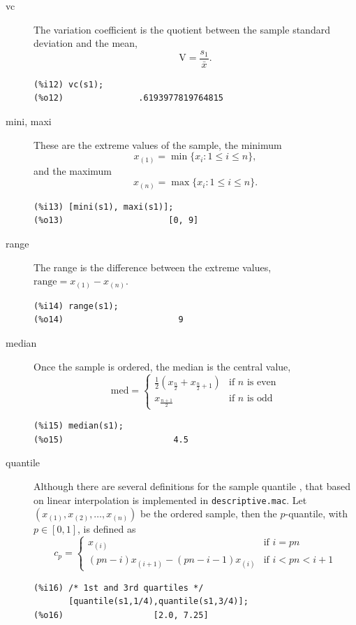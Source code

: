 \documentclass[12pt,a4paper]{article}
\begin{document}
\begin{description}
\item[vc] The variation coefficient is the quotient between the sample standard deviation and the mean,
\[
\mbox{V}= \frac{s_1}{\bar{x}}.
\]
\begin{verbatim}
(%i12) vc(s1);
(%o12)               .6193977819764815
\end{verbatim}

\item[mini, maxi] These are the extreme values of the sample, the minimum
\[
x_{(1)}=\min\{x_i: 1 \leq i \leq n\},
\]
and the maximum
\[
x_{(n)}=\max\{x_i: 1 \leq i \leq n\}.
\]
\begin{verbatim}
(%i13) [mini(s1), maxi(s1)];
(%o13)                     [0, 9]
\end{verbatim}

\item[range] The range is the difference between the extreme values, $\mbox{range}=x_{(1)}-x_{(n)}$.
\begin{verbatim}
(%i14) range(s1);
(%o14)                       9
\end{verbatim}

\item[median] Once the sample is ordered, the median is the central value,
\[
\mbox{med}= \left\{ \begin{array}{ll}
               \frac{1}{2} (x_{\frac{n}{2}} + x_{\frac{n}{2} + 1}) & \mbox{if $n$ is even} \\
               x_{\frac{n+1}{2}}                               & \mbox{if $n$ is odd}
            \end{array} \right.
\]
\begin{verbatim}
(%i15) median(s1);
(%o15)                      4.5
\end{verbatim}

\item[quantile] Although there are several definitions for the sample quantile \cite{hynd}, that based on linear interpolation is implemented in \verb|descriptive.mac|. Let $(x_{(1)}, x_{(2)}, \ldots, x_{(n)})$ be the ordered sample, then the $p$-quantile, with $p \in [0,1]$, is defined as
\[
c_p= \left\{ \begin{array}{ll}
               x_{(i)} & \mbox{if $i=p n$} \\
               (p n-i)x_{(i+1)}-(p n-i-1)x_{(i)}   & \mbox{if $i < p n <i+1$}
            \end{array} \right.
\]
\begin{verbatim}
(%i16) /* 1st and 3rd quartiles */
       [quantile(s1,1/4),quantile(s1,3/4)];
(%o16)                  [2.0, 7.25]
\end{verbatim}


\end{description}
\end{document}

